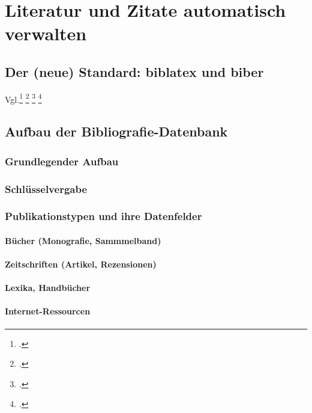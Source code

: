 \chapter{Literatur und Zitate automatisch verwalten}
\label{biblatex}

\section{Der (neue) Standard: biblatex und biber}

Vgl.\footcite[79\psqq]{rouquette:2012}
\footcite{voss:bibliografien}
\footcite{wassenhoven:dtk2008/2}
\footcite{wassenhoven:dtk2008/4}



\section{Aufbau der Bibliografie-Datenbank}

\subsection{Grundlegender Aufbau}

\subsection{Schlüsselvergabe}

\subsection{Publikationstypen und ihre Datenfelder}

\subsubsection{Bücher (Monografie, Sammmelband)}

\subsubsection{Zeitschriften (Artikel, Rezensionen)}

\subsubsection{Lexika, Handbücher}

\subsubsection{Internet-Ressourcen}

